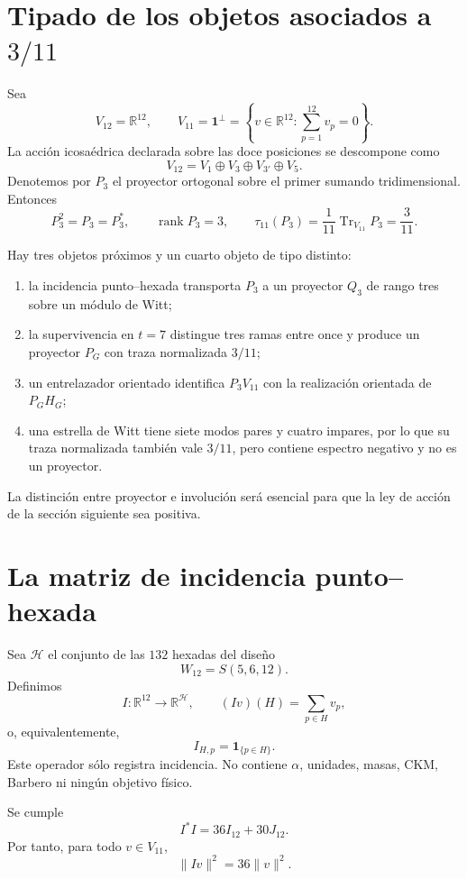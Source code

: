 \section{Tipado de los objetos asociados a \texorpdfstring{\(3/11\)}{3/11}}

Sea
\[
 V_{12}=\mathbb R^{12},
 \qquad
 V_{11}=\mathbf 1^\perp
 =\left\{v\in\mathbb R^{12}:\sum_{p=1}^{12}v_p=0\right\}.
\]
La acción icosaédrica declarada sobre las doce posiciones se descompone como
\[
 V_{12}=V_1\oplus V_3\oplus V_{3'}\oplus V_5.
\]
Denotemos por \(P_3\) el proyector ortogonal sobre el primer sumando
tridimensional. Entonces
\[
 P_3^2=P_3=P_3^*,
 \qquad
 \operatorname{rank}P_3=3,
 \qquad
 \tau_{11}(P_3)
 =\frac1{11}\operatorname{Tr}_{V_{11}}P_3
 =\frac3{11}.
\]

Hay tres objetos próximos y un cuarto objeto de tipo distinto:
\begin{enumerate}
  \item la incidencia punto--hexada transporta \(P_3\) a un proyector
  \(Q_3\) de rango tres sobre un módulo de Witt;
  \item la supervivencia en \(t=7\) distingue tres ramas entre once y
  produce un proyector \(P_G\) con traza normalizada \(3/11\);
  \item un entrelazador orientado identifica
  \(P_3V_{11}\) con la realización orientada de \(P_GH_G\);
  \item una estrella de Witt tiene siete modos pares y cuatro impares, por
  lo que su traza normalizada también vale \(3/11\), pero contiene espectro
  negativo y no es un proyector.
\end{enumerate}
La distinción entre proyector e involución será esencial para que la ley de
acción de la sección siguiente sea positiva.

\section{La matriz de incidencia punto--hexada}

Sea \(\mathcal H\) el conjunto de las \(132\) hexadas del diseño
\[
 W_{12}=S(5,6,12).
\]
Definimos
\[
 I:\mathbb R^{12}\longrightarrow\mathbb R^{\mathcal H},
 \qquad
 (Iv)(H)=\sum_{p\in H}v_p,
\]
o, equivalentemente,
\[
 I_{H,p}=\mathbf 1_{\{p\in H\}}.
\]
Este operador sólo registra incidencia. No contiene \(\alpha\), unidades,
masas, CKM, Barbero ni ningún objetivo físico.

\begin{lemma}
\label{lem:incidencia-metrica-witt}
Se cumple
\[
 \boxed{I^*I=36I_{12}+30J_{12}.}
\]
Por tanto, para todo \(v\in V_{11}\),
\[
 \|Iv\|^2=36\|v\|^2.
\]
\end{lemma}

